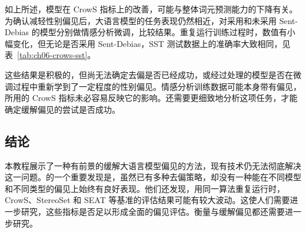 如上所述，模型在 CrowS 指标上的改善，可能与整体词元预测能力的下降有关。为确认减轻性别偏见后，大语言模型的任务表现仍然相近，对采用和未采用 Sent-Debias 的模型分别做情感分析微调，比较结果。重复运行训练过程时，数值有小幅变化，但无论是否采用 Sent-Debias，SST 测试数据上的准确率大致相同，见表~\ref{tab:ch06-crows-sst}。

这些结果是积极的，但尚无法确定去偏是否已经成功，或经过处理的模型是否在微调过程中重新学到了一定程度的性别偏见。情感分析训练数据可能本身带有偏见，所用的 CrowS 指标未必容易反映它的影响。还需要更细致地分析这项任务，才能确定缓解偏见的尝试是否成功。

\subsection{结论}
本教程展示了一种有前景的缓解大语言模型偏见的方法，现有技术仍无法彻底解决这一问题。的一个重要发现是，虽然已有多种去偏策略，却没有一种能在不同模型和不同类型的偏见上始终有良好表现。他们还发现，用同一算法重复运行时，CrowS、StereoSet 和 SEAT 等基准的评估结果可能有较大波动。这使人们需要进一步研究，这些指标是否足以形成全面的偏见评估。衡量与缓解偏见都还需要进一步研究。
